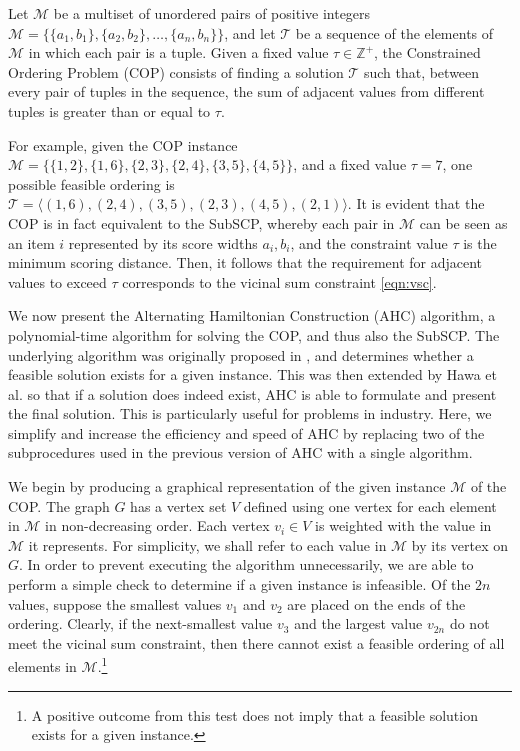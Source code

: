 \documentclass{elsarticle}
\begin{document}
\begin{definition} %
	\label{defn:cop}
	Let $\mathcal{M}$ be a multiset of unordered pairs of positive integers $\mathcal{M} = \{\{a_1, b_1\}, \{a_2, b_2\},\dotsc,\{a_n, b_n\}\}$, and let $\mathcal{T}$ be a sequence of the elements of $\mathcal{M}$ in which each pair is a tuple. Given a fixed value $\tau \in \mathbb{Z}^+$, the Constrained Ordering Problem (COP) consists of finding a solution $\mathcal{T}$ such that, between every pair of tuples in the sequence, the sum of adjacent values from different tuples is greater than or equal to $\tau$.
\end{definition}

\noindent For example, given the COP instance $\mathcal{M} = \{\{1,2\}, \{1,6\}, \{2,3\}, \{2,4\}, \{3,5\}, \{4,5\}\}$, and a fixed value $\tau = 7$, one possible feasible ordering is $\mathcal{T} = \langle(1,6), (2,4), (3,5), (2,3), (4,5), (2,1)\rangle$. It is evident that the COP is in fact equivalent to the SubSCP, whereby each pair in $\mathcal{M}$ can be seen as an item $i$ represented by its score widths $a_i, b_i$, and the constraint value $\tau$ is the minimum scoring distance. Then, it follows that the requirement for adjacent values to exceed $\tau$ corresponds to the vicinal sum constraint \eqref{eqn:vsc}.

We now present the Alternating Hamiltonian Construction (AHC) algorithm, a polynomial-time algorithm for solving the COP, and thus also the SubSCP. The underlying algorithm was originally proposed in \cite{becker2010}, and determines whether a feasible solution exists for a given instance. This was then extended by Hawa et al. \cite{hawa2018} so that if a solution does indeed exist, AHC is able to formulate and present the final solution. This is particularly useful for problems in industry. Here, we simplify and increase the efficiency and speed of AHC by replacing two of the subprocedures used in the previous version of AHC with a single algorithm.

We begin by producing a graphical representation of the given instance $\mathcal{M}$ of the COP. The graph $G$ has a vertex set $V$ defined using one vertex for each element in $\mathcal{M}$ in non-decreasing order. Each vertex $v_i \in V$ is weighted with the value in $\mathcal{M}$ it represents. For simplicity, we shall refer to each value in $\mathcal{M}$ by its vertex on $G$. In order to prevent executing the algorithm unnecessarily, we are able to perform a simple check to determine if a given instance is infeasible. Of the $2n$ values, suppose the smallest values $v_1$ and $v_2$ are placed on the ends of the ordering. Clearly, if the next-smallest value $v_3$ and the largest value $v_{2n}$ do not meet the vicinal sum constraint, then there cannot exist a feasible ordering of all elements in $\mathcal{M}$.\footnote{A positive outcome from this test does not imply that a feasible solution exists for a given instance.}
\end{document}
